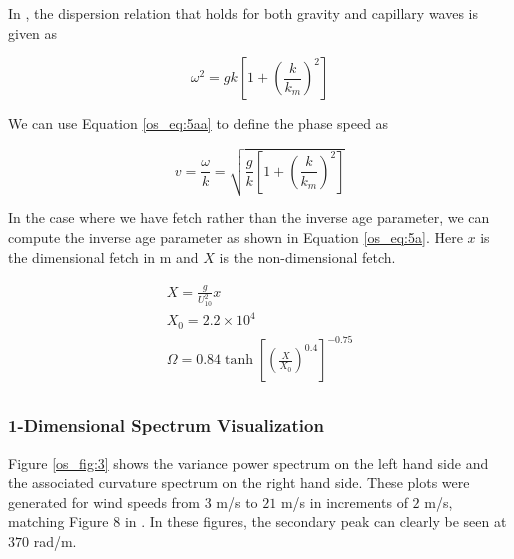 In \cite{elfouhaily}, the dispersion relation that holds for both gravity and capillary waves is given as 

\begin{equation}
\label{os_eq:5aa}
\omega^2 = gk\left[1 + \left(\frac{k}{k_m}\right)^2 \right]
\end{equation}

\noindent We can use Equation \ref{os_eq:5aa} to define the phase speed as

\begin{equation}
\label{os_eq:5ab}
v = \frac{\omega}{k}= \sqrt{\frac{g}{k}\left[1 + \left(\frac{k}{k_m}\right)^2 \right]}
\end{equation}

In the case where we have fetch rather than the inverse age parameter, we can compute the inverse age parameter as shown in Equation \ref{os_eq:5a}. Here $x$ is the dimensional fetch in m and $X$ is the non-dimensional fetch.

\begin{equation}
\label{os_eq:5a}
\begin{gathered}
 X = \frac{g}{U_{10}^2}x\\
 X_0 = 2.2 \times 10^4 \\
 \Omega = 0.84\tanh\left[\left(\frac{X}{X_0} \right)^{0.4} \right]^{-0.75} \\
\end{gathered}
\end{equation}
\renewcommand{\baselinestretch}{2} \small\normalsize

\subsubsection{1-Dimensional Spectrum Visualization}
Figure \ref{os_fig:3} shows the variance power spectrum on the left hand side and the associated curvature spectrum on the right hand side. These plots were generated for wind speeds from $3$ m/s to $21$ m/s in increments of $2$ m/s, matching Figure 8 in \cite{elfouhaily}. In these figures, the secondary peak can clearly be seen at $370$ rad/m.

